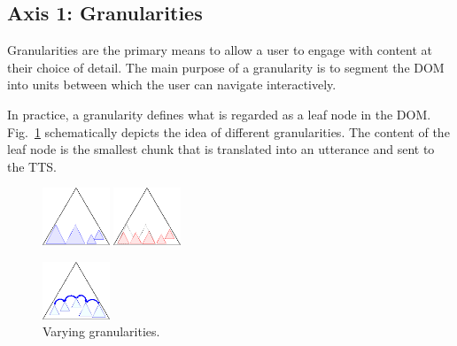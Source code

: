 \documentclass{sig-alternate}
\begin{document}
\subsection{Axis 1: Granularities}
\label{sec:ax1}

Granularities are the primary means to allow a user to engage with content at
their choice of detail. The main purpose of a granularity is to segment the DOM
into units between which the user can navigate interactively.

In practice, a granularity defines what is regarded as a leaf node in the
DOM. Fig.~\ref{fig:granularity} schematically depicts the idea of different
granularities. The content of the leaf node is the smallest chunk that is
translated into an utterance and sent to the TTS.

\begin{figure}[t!]
  \begin{minipage}{.33\linewidth}
    \begin{center}
      \leavevmode
      \includegraphics[width=2cm]{images/granularity1}
      \EndAccSupp{}
      \qquad
      \includegraphics[width=2cm]{images/granularity2}
      \EndAccSupp{}
      \caption{Varying granularities.}
      \label{fig:granularity}
    \end{center}
  \end{minipage}
  \begin{minipage}{.33\linewidth}
  \begin{center}
    \leavevmode
    \includegraphics[width=2cm]{images/walker1}

\end{center}
\end{minipage}
\end{figure}
\end{document}
